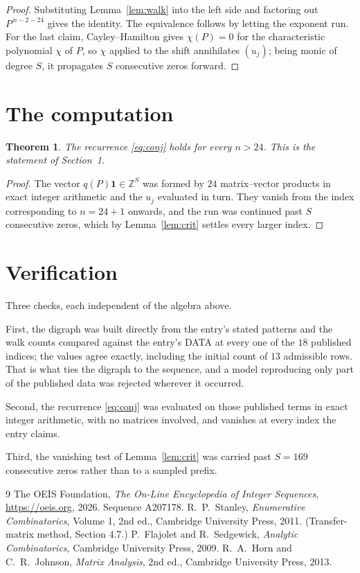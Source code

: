 \documentclass[11pt,a4paper]{article}
\theoremstyle{plain}
\newtheorem{theorem}{Theorem}
\theoremstyle{definition}
\begin{document}
\begin{proof}
Substituting Lemma~\ref{lem:walk} into the left side and factoring out
$P^{\,n-2-24}$ gives the identity. The equivalence follows by letting the exponent
run. For the last claim, Cayley--Hamilton gives $\chi(P)=0$ for the characteristic
polynomial $\chi$ of $P$, so $\chi$ applied to the shift annihilates $(u_j)$; being monic of
degree $S$, it propagates $S$ consecutive zeros forward.
\end{proof}

\section{The computation}

\begin{theorem}
The recurrence \eqref{eq:conj} holds for every $n>24$. This is the statement of
Section~1.
\end{theorem}

\begin{proof}
The vector $q(P)\mathbf{1}\in\mathbb{Z}^{S}$ was formed by $24$ matrix--vector
products in exact integer arithmetic and the $u_j$ evaluated in turn. They vanish from the
index corresponding to $n=24+1$ onwards, and the run was continued past $S$ consecutive
zeros, which by Lemma~\ref{lem:crit} settles every larger index.
\end{proof}

\section{Verification}

Three checks, each independent of the algebra above.

First, the digraph was built directly from the entry's stated patterns and the walk counts
compared against the entry's DATA at every one of the $18$ published indices; the
values agree exactly, including the initial count of $13$ admissible rows. That is
what ties the digraph to the sequence, and a model reproducing only part of the published
data was rejected wherever it occurred.

Second, the recurrence \eqref{eq:conj} was evaluated on those published terms in exact
integer arithmetic, with no matrices involved, and vanishes at every index the entry claims.

Third, the vanishing test of Lemma~\ref{lem:crit} was carried past $S=169$ consecutive
zeros rather than to a sampled prefix.

\begin{thebibliography}{9}
 The OEIS Foundation, \emph{The On-Line Encyclopedia of Integer
Sequences}, \url{https://oeis.org}, 2026. Sequence A207178.
 R.~P.~Stanley, \emph{Enumerative Combinatorics}, Volume 1, 2nd ed.,
Cambridge University Press, 2011. (Transfer-matrix method, Section 4.7.)
 P.~Flajolet and R.~Sedgewick, \emph{Analytic Combinatorics}, Cambridge
University Press, 2009.
 R.~A.~Horn and C.~R.~Johnson, \emph{Matrix Analysis}, 2nd ed., Cambridge
University Press, 2013.
\end{thebibliography}
\end{document}
